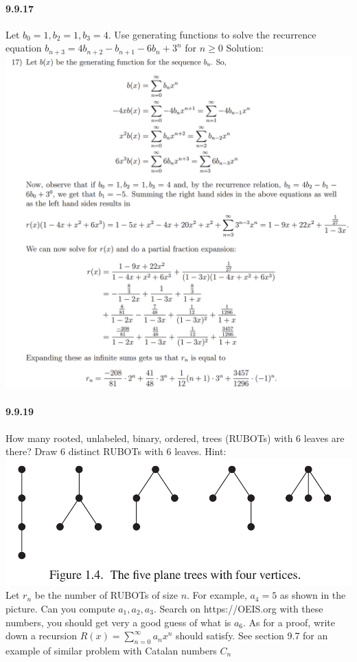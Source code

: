 \documentclass{article}
\begin{document}
\paragraph{9.9.17}
Let $b_0=1, b_2=1, b_3=4$. Use generating functions to solve the recurrence equation $b_{n+3}=4b_{n+2}-b_{n+1}-6b_n+3^n$ for $n\ge 0$\newline
Solution:\newline
\includegraphics{0050}
\paragraph{9.9.19}
How many rooted, unlabeled, binary, ordered, trees (RUBOTs) with 6 leaves are there? Draw 6 distinct RUBOTs with 6 leaves.\newline
Hint:\newline
\includegraphics{0051}
Let $r_n$ be the number of RUBOTs of size $n$.
For example, $a_4=5$ as shown in the picture.\newline
Can you compute $a_1,a_2,a_3$\newline.
Search on https://OEIS.org with these numbers, you should get very a good guess of what is $a_6$.\newline
As for a proof, write down a recursion $R(x)=\sum_{n=0}^{\infty}a_nx^n$ should satisfy.\newline
See section 9.7 for an example of similar problem with Catalan numbers $C_n$
\end{document}
